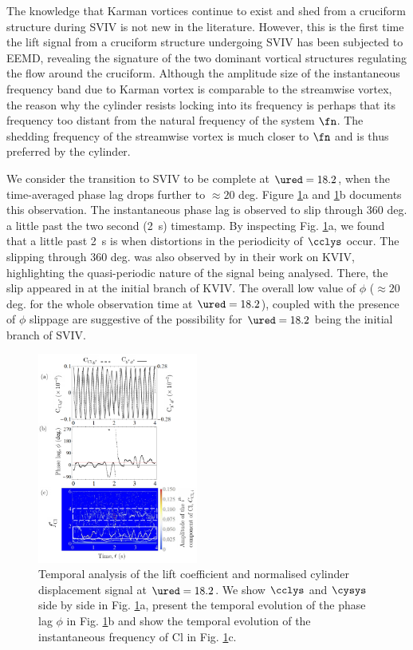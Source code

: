 \documentclass[a4paper,fleqn]{cas-sc}
\begin{document}
The knowledge that Karman vortices continue to exist and shed from a cruciform structure during SVIV is not new in the literature. However, this is the first time the lift signal from a cruciform structure undergoing SVIV has been subjected to EEMD, revealing the signature of the two dominant vortical structures regulating the flow around the cruciform. Although the amplitude size of the instantaneous frequency band due to Karman vortex is comparable to the streamwise vortex, the reason why the cylinder resists locking into its frequency is perhaps that its frequency too distant from the natural frequency of the system $\fn$. The shedding frequency of the streamwise vortex is much closer to $\fn$ and is thus preferred by the cylinder.

We consider the transition to SVIV to be complete at $\ured = 18.2$, when the time-averaged phase lag drops further to $\approx 20$ deg. Figure \ref{fig:tempAnalysisStableInitialBranch}a and \ref{fig:tempAnalysisStableInitialBranch}b documents this observation. The instantaneous phase lag is observed to slip through 360 deg. a little past the two second (\SI{2}{\second}) timestamp. By inspecting Fig. \ref{fig:tempAnalysisStableInitialBranch}a, we found that a little past \SI{2}{\second} is when distortions in the periodicity of $\cclys$ occur. The slipping through 360 deg. was also observed by \citet{Khalak1999} in their work on KVIV, highlighting the quasi-periodic nature of the signal being analysed. There, the slip appeared in \citet{Khalak1999} at the initial branch of KVIV. The overall low value of $\phi$ ($\approx 20$ deg. for the whole observation time at $\ured = 18.2$), coupled with the presence of $\phi$ slippage are suggestive of the possibility for $\ured = 18.2$ being the initial branch of SVIV.

\begin{figure}
  \centering
  \includegraphics[width=0.47\textwidth]{figs/figure17}
  \caption{Temporal analysis of the lift coefficient and normalised cylinder displacement signal at $\ured = 18.2$. We show $\cclys$ and $\cysys$ side by side in Fig. \ref{fig:tempAnalysisStableInitialBranch}a, present the temporal evolution of the phase lag $\phi$ in Fig. \ref{fig:tempAnalysisStableInitialBranch}b and show the temporal evolution of the instantaneous frequency of Cl in Fig. \ref{fig:tempAnalysisStableInitialBranch}c.}
  \label{fig:tempAnalysisStableInitialBranch}
\end{figure}
\end{document}

